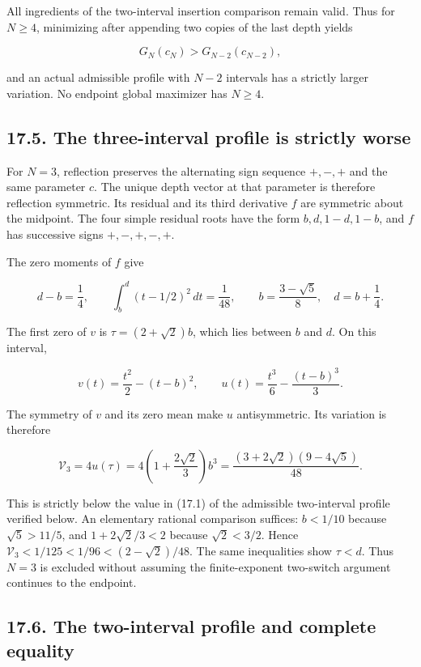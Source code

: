 \documentclass[11pt]{article}
\begin{document}
All ingredients of the two-interval insertion comparison remain valid.
Thus for \(N\ge4\), minimizing after appending two copies of the last
depth yields

\[
G_N(c_N)>G_{N-2}(c_{N-2}),
\tag{17.10}
\]

and an actual admissible profile with \(N-2\) intervals has a strictly
larger variation. No endpoint global maximizer has \(N\ge4\).

\subsection{17.5. The three-interval profile is strictly
worse}\label{the-three-interval-profile-is-strictly-worse}

For \(N=3\), reflection preserves the alternating sign sequence
\(+,-,+\) and the same parameter \(c\). The unique depth vector at that
parameter is therefore reflection symmetric. Its residual and its third
derivative \(f\) are symmetric about the midpoint. The four simple
residual roots have the form \(b,d,1-d,1-b\), and \(f\) has successive
signs \(+,-,+,-,+\).

The zero moments of \(f\) give

\[
d-b=\frac14,\qquad
\int_b^d(t-1/2)^2\,dt=\frac1{48},
\qquad
b=\frac{3-\sqrt5}{8},\quad d=b+\frac14.
\tag{17.11}
\]

The first zero of \(v\) is \(\tau=(2+\sqrt2)b\), which lies between
\(b\) and \(d\). On this interval,

\[
v(t)=\frac{t^2}{2}-(t-b)^2,\qquad
u(t)=\frac{t^3}{6}-\frac{(t-b)^3}{3}.
\]

The symmetry of \(v\) and its zero mean make \(u\) antisymmetric. Its
variation is therefore

\[
\mathcal V_3=4u(\tau)
=4\left(1+\frac{2\sqrt2}{3}\right)b^3
=\frac{(3+2\sqrt2)(9-4\sqrt5)}{48}.
\tag{17.12}
\]

This is strictly below the value in (17.1) of the admissible
two-interval profile verified below. An elementary rational comparison
suffices: \(b<1/10\) because \(\sqrt5>11/5\), and \(1+2\sqrt2/3<2\)
because \(\sqrt2<3/2\). Hence \(\mathcal V_3<1/125<1/96<(2-\sqrt2)/48\).
The same inequalities show \(\tau<d\). Thus \(N=3\) is excluded without
assuming the finite-exponent two-switch argument continues to the
endpoint.

\subsection{17.6. The two-interval profile and complete
equality}\label{the-two-interval-profile-and-complete-equality}
\end{document}

